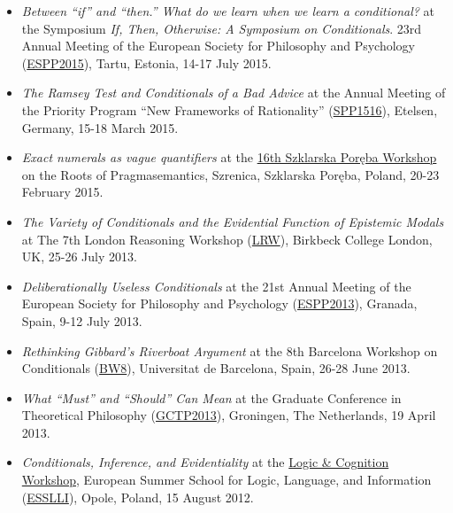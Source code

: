 \documentclass[a4paper,12pt]{article}
\begin{document}
\begin{small}
  \begin{itemize}
    \item \emph{Between ``if'' and ``then.'' What do we learn when we learn a conditional?} at the Symposium \emph{If, Then, Otherwise: A Symposium on Conditionals}. 23rd Annual Meeting of the European Society for Philosophy and Psychology (\href{http://espp2015.ut.ee}{ESPP2015}), Tartu, Estonia, 14-17 July 2015.

    \item \emph{The Ramsey Test and Conditionals of a Bad Advice} at the Annual Meeting of the Priority Program ``New Frameworks of Rationality'' (\href{http://www.spp1516.de}{SPP1516}), Etelsen, Germany, 15-18 March 2015.

    \item \emph{Exact numerals as vague quantifiers} at the \href{https://sites.google.com/site/szklarskaporebaworkshop16/}{16th Szklarska Poręba Workshop} on the Roots of Pragmasemantics, Szrenica, Szklarska Poręba, Poland, 20-23 February 2015.

    \item \emph{The Variety of Conditionals and the Evidential Function of Epistemic Modals} at The 7th London Reasoning Workshop (\href{http://www.bbk.ac.uk/psychology/about-us/events/the-7th-london-reasoning-workshop}{LRW}), Birkbeck College London, UK, 25-26 July 2013.

    \item \emph{Deliberationally Useless Conditionals} at the 21st Annual Meeting of the European Society for Philosophy and Psychology (\href{http://espp2013.com}{ESPP2013}), Granada, Spain, 9-12 July 2013.

    \item \emph{Rethinking Gibbard’s Riverboat Argument} at the 8th Barcelona Workshop on Conditionals
    (\href{http://www.ub.edu/logosbw/bw8/index.html}{BW8}), Universitat de Barcelona, Spain, 26-28 June 2013.
    
    \item \emph{What ``Must'' and ``Should'' Can Mean} at the Graduate Conference in Theoretical Philosophy
    (\href{http://www.philos.rug.nl/GCTP2013/}{GCTP2013}), Groningen, The Netherlands, 19 April 2013. 
    
    \item \emph{Conditionals, Inference, and Evidentiality} at the \href{http://www.ai.rug.nl/SocialCognition/logic-cognition/}{Logic \& Cognition Workshop}, European Summer School for Logic, Language, and Information (\href{http://www.esslli2012.pl}{ESSLLI}), Opole, Poland, 15 August 2012. 


\end{itemize}
\end{small}
\end{document}
